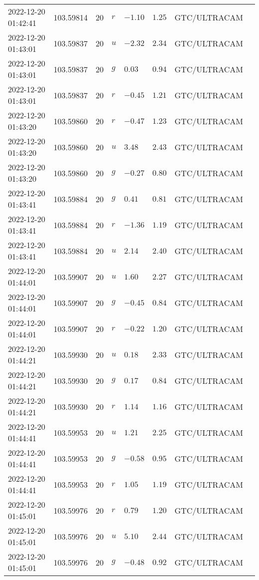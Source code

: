\documentclass{nature_plusfigure}
\begin{document}
\begin{supplement}
\begin{center}
\begin{longtable}{llllllll}
2022-12-20 01:42:41 & 103.59814 & 20 & $r$ & $-1.10$ & $1.25$ & GTC/ULTRACAM &  \\ 
2022-12-20 01:43:01 & 103.59837 & 20 & $u$ & $-2.32$ & $2.34$ & GTC/ULTRACAM &  \\ 
2022-12-20 01:43:01 & 103.59837 & 20 & $g$ & $0.03$ & $0.94$ & GTC/ULTRACAM &  \\ 
2022-12-20 01:43:01 & 103.59837 & 20 & $r$ & $-0.45$ & $1.21$ & GTC/ULTRACAM &  \\ 
2022-12-20 01:43:20 & 103.59860 & 20 & $r$ & $-0.47$ & $1.23$ & GTC/ULTRACAM &  \\ 
2022-12-20 01:43:20 & 103.59860 & 20 & $u$ & $3.48$ & $2.43$ & GTC/ULTRACAM &  \\ 
2022-12-20 01:43:20 & 103.59860 & 20 & $g$ & $-0.27$ & $0.80$ & GTC/ULTRACAM &  \\ 
2022-12-20 01:43:41 & 103.59884 & 20 & $g$ & $0.41$ & $0.81$ & GTC/ULTRACAM &  \\ 
2022-12-20 01:43:41 & 103.59884 & 20 & $r$ & $-1.36$ & $1.19$ & GTC/ULTRACAM &  \\ 
2022-12-20 01:43:41 & 103.59884 & 20 & $u$ & $2.14$ & $2.40$ & GTC/ULTRACAM &  \\ 
2022-12-20 01:44:01 & 103.59907 & 20 & $u$ & $1.60$ & $2.27$ & GTC/ULTRACAM &  \\ 
2022-12-20 01:44:01 & 103.59907 & 20 & $g$ & $-0.45$ & $0.84$ & GTC/ULTRACAM &  \\ 
2022-12-20 01:44:01 & 103.59907 & 20 & $r$ & $-0.22$ & $1.20$ & GTC/ULTRACAM &  \\ 
2022-12-20 01:44:21 & 103.59930 & 20 & $u$ & $0.18$ & $2.33$ & GTC/ULTRACAM &  \\ 
2022-12-20 01:44:21 & 103.59930 & 20 & $g$ & $0.17$ & $0.84$ & GTC/ULTRACAM &  \\ 
2022-12-20 01:44:21 & 103.59930 & 20 & $r$ & $1.14$ & $1.16$ & GTC/ULTRACAM &  \\ 
2022-12-20 01:44:41 & 103.59953 & 20 & $u$ & $1.21$ & $2.25$ & GTC/ULTRACAM &  \\ 
2022-12-20 01:44:41 & 103.59953 & 20 & $g$ & $-0.58$ & $0.95$ & GTC/ULTRACAM &  \\ 
2022-12-20 01:44:41 & 103.59953 & 20 & $r$ & $1.05$ & $1.19$ & GTC/ULTRACAM &  \\ 
2022-12-20 01:45:01 & 103.59976 & 20 & $r$ & $0.79$ & $1.20$ & GTC/ULTRACAM &  \\ 
2022-12-20 01:45:01 & 103.59976 & 20 & $u$ & $5.10$ & $2.44$ & GTC/ULTRACAM &  \\ 
2022-12-20 01:45:01 & 103.59976 & 20 & $g$ & $-0.48$ & $0.92$ & GTC/ULTRACAM &  \\ 

\end{longtable}
\end{center}
\end{supplement}
\end{document}
